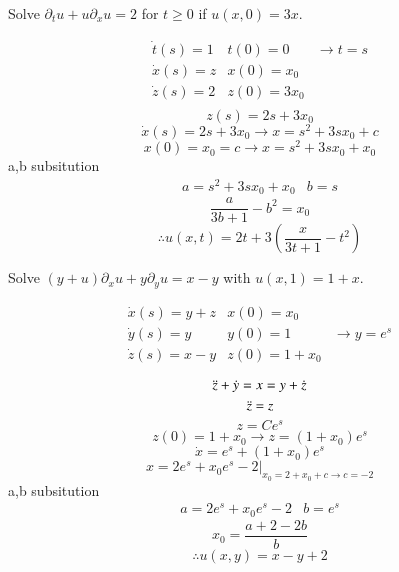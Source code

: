 \documentclass[12pt]{exam}
\newcommand{\px}{\partial_x}
\newcommand{\py}{\partial_y}
\newcommand{\pt}{\partial_t}
\begin{document}
\newpage 
\begin{questions}
\question Solve $\pt u + u\px u = 2$ for $t\geq 0$ if $u(x,0) = 3x$. 
\begin{solutionorbox}[\stretch{1}]
$$
\begin{matrix}
  \Dot{t}(s) = 1 & t(0) = 0 & \rightarrow t = s \\
  \Dot{x}(s) = z & x(0) = x_0 &\\
  \Dot{z}(s) = 2 & z(0) = 3x_0 &\\
\end{matrix}
$$
\[z(s) = 2s + 3x_0\]
\[\Dot{x}(s) = 2s + 3x_0 \rightarrow x=s^2 + 3sx_0 + c\]
\[x(0) = x_0 = c\rightarrow x=s^2 + 3sx_0 + x_0\]
a,b subsitution
$$
\begin{matrix}
  a = s^2 + 3sx_0 + x_0 & b = s
\end{matrix}
$$
\[\frac{a}{3b+1}-b^2 = x_0\]
\[\therefore u(x,t)=2t+3\left(\frac{x}{3t+1}-t^2\right)\]
\end{solutionorbox}

\newpage 
\question Solve $(y+u)\px u + y\py u = x-y$ with $u(x,1) = 1+x$.
\begin{solutionorbox}[\stretch{1}]
$$
\begin{matrix}
  \Dot{x}(s) =y + z & x(0) = x_0 &\\
  \Dot{y}(s) = y & y(0) = 1 &\rightarrow y = e^s \\
  \Dot{z}(s) = x-y & z(0) = 1+x_0 &\\
\end{matrix}
$$
\[\Ddot{z}+\Dot{y} =x={y}+\Dot{z}\]
\[\Ddot{z} = z\]
\[z = Ce^s\]
\[z(0) = 1+x_0 \rightarrow z=(1+x_0)e^s\]
\[\Dot{x}=e^s + (1+x_0)e^s\]
\[x = 2e^s + x_0e^s - 2|_{x_0=2+x_0+c\rightarrow c=-2}\]
a,b subsitution
$$
\begin{matrix}
  a = 2e^s + x_0e^s - 2 & b = e^s
\end{matrix}
$$
\[x_0 = \frac{a+2-2b}{b}\]
\[\therefore u(x,y)=x-y+2\]
\end{solutionorbox}


\end{questions}
\end{document}
